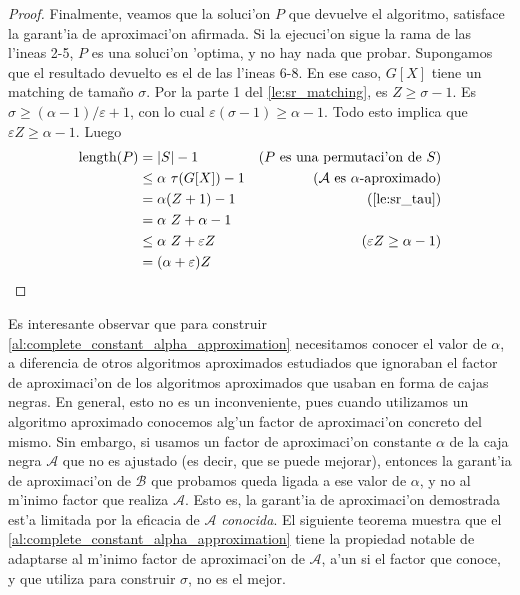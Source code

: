 \begin{theorem}
\begin{proof}
Finalmente, veamos que la soluci'on $P$ que devuelve el algoritmo, satisface la garant'ia de aproximaci'on afirmada. Si la ejecuci'on sigue la rama de las l'ineas 2-5, $P$ es una soluci'on 'optima, y no hay nada que probar. Supongamos que el resultado devuelto es el de las l'ineas 6-8. En ese caso, $G[X]$ tiene un matching de tama\~no $\sigma$. Por la parte 1 del \autoref{le:sr_matching}, es $Z \geq \sigma - 1$. Es $\sigma \geq (\alpha - 1) / \varepsilon + 1$, con lo cual $\varepsilon (\sigma - 1) \geq \alpha - 1$. Todo esto implica que $\varepsilon Z \geq \alpha - 1$. Luego
\begin{align*}
\length(P) &= |S| - 1 & \text{(} P \text{ es una permutaci'on de } S \text{)}\\
&\leq \alpha \text{ } \tau(G[X]) - 1 & \text{(} \mathcal{A} \text{ es } \alpha \text{-aproximado)}\\
&= \alpha (Z + 1) - 1 & \text{(\autoref{le:sr_tau})}\\
&= \alpha \text{ } Z + \alpha - 1\\
&\leq \alpha \text{ } Z + \varepsilon Z & \text{(} \varepsilon Z \geq \alpha - 1 \text{)}\\
&= (\alpha + \varepsilon) Z&
\end{align*}

\end{proof}
\end{theorem}

Es interesante observar que para construir \autoref{al:complete_constant_alpha_approximation} necesitamos conocer el valor de $\alpha$, a diferencia de otros algoritmos aproximados estudiados que ignoraban el factor de aproximaci'on de los algoritmos aproximados que usaban en forma de cajas negras. En general, esto no es un inconveniente, pues cuando utilizamos un algoritmo aproximado conocemos alg'un factor de aproximaci'on concreto del mismo. Sin embargo, si usamos un factor de aproximaci'on constante $\alpha$ de la caja negra $\mathcal{A}$ que no es ajustado (es decir, que se puede mejorar), entonces la garant'ia de aproximaci'on de $\mathcal{B}$ que probamos queda ligada a ese valor de $\alpha$, y no al m'inimo factor que realiza $\mathcal{A}$. Esto es, la garant'ia de aproximaci'on demostrada est'a limitada por la eficacia de $\mathcal{A}$ \emph{conocida}. El siguiente teorema muestra que el \autoref{al:complete_constant_alpha_approximation} tiene la propiedad notable de adaptarse al m'inimo factor de aproximaci'on de $\mathcal{A}$, a'un si el factor que conoce, y que utiliza para construir $\sigma$, no es el mejor.

